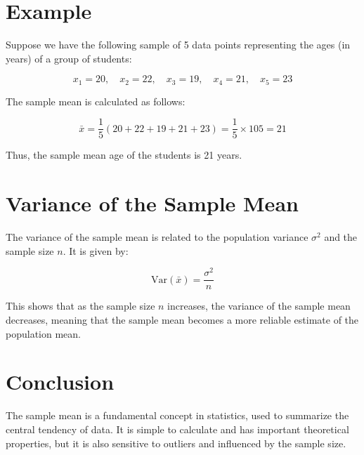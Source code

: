 \documentclass{article}
\begin{document}
\section*{Example}

Suppose we have the following sample of 5 data points representing the ages (in years) of a group of students:

\[
x_1 = 20, \quad x_2 = 22, \quad x_3 = 19, \quad x_4 = 21, \quad x_5 = 23
\]

The sample mean is calculated as follows:

\[
\bar{x} = \frac{1}{5} \left( 20 + 22 + 19 + 21 + 23 \right) = \frac{1}{5} \times 105 = 21
\]

Thus, the sample mean age of the students is 21 years.

\section*{Variance of the Sample Mean}

The variance of the sample mean is related to the population variance $\sigma^2$ and the sample size $n$. It is given by:

\[
\text{Var}(\bar{x}) = \frac{\sigma^2}{n}
\]

This shows that as the sample size $n$ increases, the variance of the sample mean decreases, meaning that the sample mean becomes a more reliable estimate of the population mean.

\section*{Conclusion}

The sample mean is a fundamental concept in statistics, used to summarize the central tendency of data. It is simple to calculate and has important theoretical properties, but it is also sensitive to outliers and influenced by the sample size.
\end{document}
